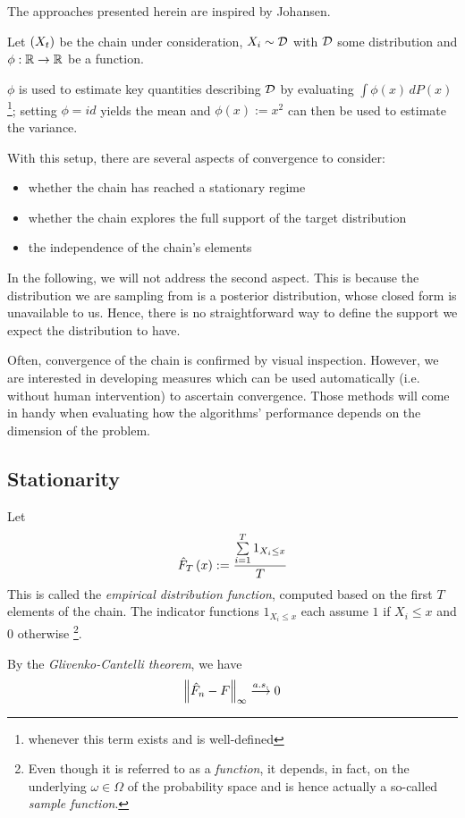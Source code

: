 
The approaches presented herein are inspired by Johansen\cite{mcnotes}.



Let $\left(X_t\right)$ be the chain under consideration, $X_i \sim \mathcal{D}$ with $\mathcal{D}$ some distribution and $\phi : \mathbb{R} \rightarrow \mathbb{R}$ be a function. 

$\phi$ is used to estimate key quantities describing $\mathcal{D}$ by evaluating $\int \phi(x) \, dP(x)$\footnote{whenever this term exists and is well-defined}; setting $\phi = id$ yields the mean and $\phi(x) := x^2$ can then be used to estimate the variance. 

 
With this setup, there are several aspects of convergence to consider: 
\begin{itemize}
	\item whether the chain has reached a stationary regime
	\item whether the chain explores the full support of the target distribution 
	\item the independence of the chain's elements 
\end{itemize}

In the following, we will not address the second aspect.
This is because the distribution we are sampling from is a posterior distribution, whose closed form is unavailable to us. Hence, there is no straightforward way to define the support we expect the distribution to have.

Often, convergence of the chain is confirmed by visual inspection. However, we are interested in developing measures which can be used automatically (i.e. without human intervention) to ascertain convergence. Those methods will come in handy when evaluating how the algorithms' performance depends on the dimension of the problem.

\subsection{Stationarity}
\label{chap:stationarity}
Let 
\[
	\hat{F}_T\left(x\right) := \frac{\sum\limits_{i=1}^T 1_{X_i \leq x}}{T}
\]
This is called the \textit{empirical distribution function}, computed based on the first $T$ elements of the chain.
The indicator functions $1_{X_i \leq x}$ each assume $1$ if $X_i \leq x$ and $0$ otherwise \footnote{Even though it is referred to as a \textit{function}, it depends, in fact, on the underlying $\omega \in \Omega$ of the probability space and is hence actually a so-called \textit{sample function}. }. 

By the \textit{Glivenko-Cantelli theorem}, we have
\[
	\left\lVert\hat{F}_n - F\right\rVert_\infty \overset{a.s.}{\longrightarrow} 0
\]

